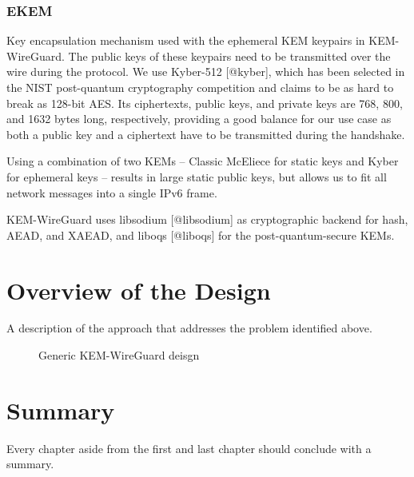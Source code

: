 \subsubsection{EKEM}

Key encapsulation mechanism used with the ephemeral KEM keypairs in
KEM-WireGuard. The public keys of these keypairs need to be transmitted over
the wire during the protocol. We use Kyber-512 {[}@kyber{]}, which has
been selected in the NIST post-quantum cryptography competition and
claims to be as hard to break as 128-bit AES. Its ciphertexts, public
keys, and private keys are 768, 800, and 1632 bytes long, respectively,
providing a good balance for our use case as both a public key and a
ciphertext have to be transmitted during the handshake.


\begin{tcolorbox}[colback=gray!]
\end{tcolorbox}

Using a combination of two KEMs -- Classic McEliece for static keys and
Kyber for ephemeral keys -- results in large static public keys, but
allows us to fit all network messages into a single IPv6 frame.

KEM-WireGuard uses libsodium {[}@libsodium{]} as cryptographic backend for
hash, AEAD, and XAEAD, and liboqs {[}@liboqs{]} for the
post-quantum-secure KEMs.


\section{Overview of the Design}
\label{sec:OverviewOfDesign}
A description of the approach that addresses the problem identified above.
\begin{figure}[!htb]
\centering
\captionsetup{justification=centering}

\caption{Generic KEM-WireGuard deisgn}
\end{figure}

\section{Summary}
\label{sec:SummaryDesign}

Every chapter aside from the first and last chapter should conclude with a summary. 
